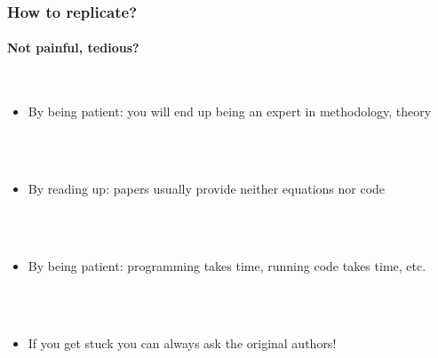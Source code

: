 \documentclass{beamer}
\begin{document}
\begin{frame}[fragile]
\frametitle{How to replicate?}
\framesubtitle{Not painful, tedious?}
        \  \\

\begin{itemize}
\item<2-> By being patient: you will end up being an expert in methodology, theory

\ \\

\ \\

 \item <3-> By reading up: papers usually provide neither equations nor code
 
\ \\

 \ \\
 
\item<4->  By being patient: programming takes time, running code takes time, etc.

 
\ \\

 \ \\
 
\item<5-> If you get stuck you can always ask the original authors!
\end{itemize}


\end{frame}
\end{document}
